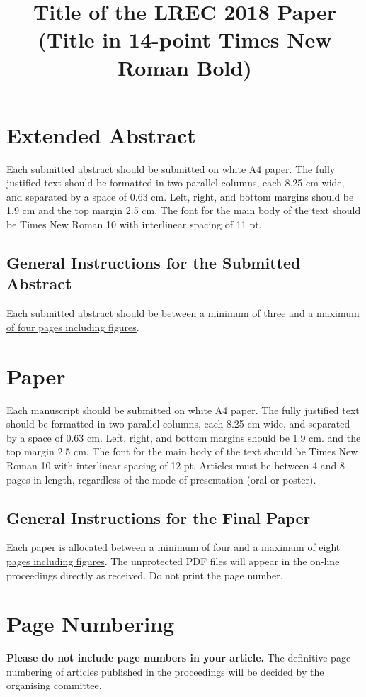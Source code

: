 \documentclass[10pt, a4paper]{article}
\title{Title of the LREC 2018 Paper (Title in 14-point Times New Roman Bold)\\ \vspace*{.5\baselineskip} \normalfont{ The Title \ul{Must Be} Capitalised as in:\\ \vspace*{.5\baselineskip} \textbf{The Rise and Fall of Ziggy Stardust and the Spiders from Mars}}}
\begin{document}
\maketitleabstract

\section{Extended Abstract}

Each submitted abstract should be submitted on white A4 paper. The fully
justified text should be formatted in two parallel columns, each 8.25 cm wide,
and separated by a space of 0.63 cm. Left, right, and bottom margins should be
1.9 cm and the top margin 2.5 cm. The font for the main body of the text should
be Times New Roman 10 with interlinear spacing of 11 pt.

\subsection{General Instructions for the Submitted Abstract}

Each submitted abstract should be between \ul{a minimum of three and
a maximum of four pages including figures}.

\section{Paper}

Each manuscript should be submitted on white A4 paper. The fully
justified text should be formatted in two parallel columns, each 8.25 cm wide,
and separated by a space of 0.63 cm. Left, right, and bottom margins should be
1.9 cm. and the top margin 2.5 cm. The font for the main body of the text should
be Times New Roman 10 with interlinear spacing of 12 pt.  Articles must be
between 4 and 8 pages in length, regardless of the mode of presentation (oral
or poster).

\subsection{General Instructions for the Final Paper}

Each paper is allocated between \ul{a minimum of four and a maximum of
eight pages including figures}. The unprotected PDF files will appear in the
on-line proceedings directly as received. Do not print the page number.

\section{Page Numbering}

\textbf{Please do not include page numbers in your article.} The definitive page
numbering of articles published in the proceedings will be decided by the
organising committee.
\end{document}
